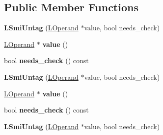 \subsection*{Public Member Functions}
\begin{DoxyCompactItemize}
\item 
{\bfseries L\+Smi\+Untag} (\hyperlink{classv8_1_1internal_1_1_l_operand}{L\+Operand} $\ast$value, bool needs\+\_\+check)\hypertarget{classv8_1_1internal_1_1_l_smi_untag_a99550a964b25423e9a97f87404e62eb7}{}\label{classv8_1_1internal_1_1_l_smi_untag_a99550a964b25423e9a97f87404e62eb7}

\item 
\hyperlink{classv8_1_1internal_1_1_l_operand}{L\+Operand} $\ast$ {\bfseries value} ()\hypertarget{classv8_1_1internal_1_1_l_smi_untag_a50eaec50a1f507400e188bf08855dbe0}{}\label{classv8_1_1internal_1_1_l_smi_untag_a50eaec50a1f507400e188bf08855dbe0}

\item 
bool {\bfseries needs\+\_\+check} () const \hypertarget{classv8_1_1internal_1_1_l_smi_untag_a018002e5d63a6636917daf709371ecea}{}\label{classv8_1_1internal_1_1_l_smi_untag_a018002e5d63a6636917daf709371ecea}

\item 
{\bfseries L\+Smi\+Untag} (\hyperlink{classv8_1_1internal_1_1_l_operand}{L\+Operand} $\ast$value, bool needs\+\_\+check)\hypertarget{classv8_1_1internal_1_1_l_smi_untag_a99550a964b25423e9a97f87404e62eb7}{}\label{classv8_1_1internal_1_1_l_smi_untag_a99550a964b25423e9a97f87404e62eb7}

\item 
\hyperlink{classv8_1_1internal_1_1_l_operand}{L\+Operand} $\ast$ {\bfseries value} ()\hypertarget{classv8_1_1internal_1_1_l_smi_untag_a50eaec50a1f507400e188bf08855dbe0}{}\label{classv8_1_1internal_1_1_l_smi_untag_a50eaec50a1f507400e188bf08855dbe0}

\item 
bool {\bfseries needs\+\_\+check} () const \hypertarget{classv8_1_1internal_1_1_l_smi_untag_a018002e5d63a6636917daf709371ecea}{}\label{classv8_1_1internal_1_1_l_smi_untag_a018002e5d63a6636917daf709371ecea}

\item 
{\bfseries L\+Smi\+Untag} (\hyperlink{classv8_1_1internal_1_1_l_operand}{L\+Operand} $\ast$value, bool needs\+\_\+check)\hypertarget{classv8_1_1internal_1_1_l_smi_untag_a99550a964b25423e9a97f87404e62eb7}{}\label{classv8_1_1internal_1_1_l_smi_untag_a99550a964b25423e9a97f87404e62eb7}


\end{DoxyCompactItemize}
